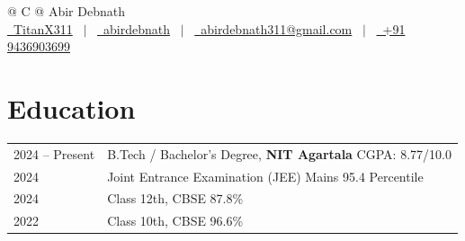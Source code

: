 \documentclass[a4paper,12pt]{article}
\begin{document}
\pagestyle{empty} 



\begin{tabularx}{\linewidth}{@{} C @{}}
\Huge{Abir Debnath} \\[7.5pt]
\href{https://github.com/TitanX311}{\raisebox{-0.05\height}\faGithub\ TitanX311} \ $|$ \ 
\href{https://www.linkedin.com/in/abir-debnath-953126282/}{\raisebox{-0.05\height}\faLinkedin\ abirdebnath} \ $|$ \ 
\href{abirdebnath311@gmail.com}{\raisebox{-0.05\height}\faEnvelope \ abirdebnath311@gmail.com} \ $|$ \ 
\href{tel:+919436903699}{\raisebox{-0.05\height}\faMobile \ +91 9436903699} \\
\end{tabularx}

\section{Education}
\begin{tabularx}{\linewidth}{@{}l X@{}}	
2024 -- Present & B.Tech / Bachelor's Degree, \textbf{NIT Agartala} \hfill CGPA: 8.77/10.0 \\
2024 & Joint Entrance Examination (JEE) Mains \hfill 95.4 Percentile \\
2024 & Class 12th, CBSE \hfill 87.8\% \\ 
2022 & Class 10th, CBSE \hfill 96.6\% \\
\end{tabularx}

\end{document}
